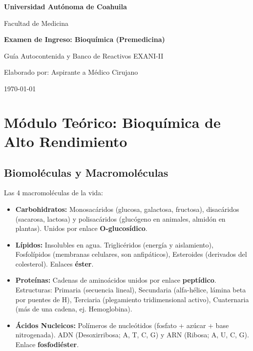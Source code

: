 \documentclass[spanish,letterpaper,oneside]{article}
\begin{document}
\begin{titlepage}
    \centering
    \vspace*{2cm}
    {\Huge \textbf{Universidad Autónoma de Coahuila} \par}
    \vspace{1cm}
    {\Large Facultad de Medicina \par}
    \vspace{2cm}
    {\LARGE \textbf{Examen de Ingreso: Bioquímica (Premedicina)} \par}
    \vspace{1cm}
    {\Large Guía Autocontenida y Banco de Reactivos EXANI-II \par}
    \vspace{3cm}
    {\large Elaborado por: Aspirante a Médico Cirujano \par}
    \vfill
    {\large \today \par}
\end{titlepage}

\tableofcontents
\newpage

\section{Módulo Teórico: Bioquímica de Alto Rendimiento}
\subsection{Biomoléculas y Macromoléculas}
Las 4 macromoléculas de la vida:
\begin{itemize}
    \item \textbf{Carbohidratos:} Monosacáridos (glucosa, galactosa, fructosa), disacáridos (sacarosa, lactosa) y polisacáridos (glucógeno en animales, almidón en plantas). Unidos por enlace \textbf{O-glucosídico}.
    \item \textbf{Lípidos:} Insolubles en agua. Triglicéridos (energía y aislamiento), Fosfolípidos (membranas celulares, son anfipáticos), Esteroides (derivados del colesterol). Enlaces \textbf{éster}.
    \item \textbf{Proteínas:} Cadenas de aminoácidos unidos por enlace \textbf{peptídico}. Estructuras: Primaria (secuencia lineal), Secundaria (alfa-hélice, lámina beta por puentes de H), Terciaria (plegamiento tridimensional activo), Cuaternaria (más de una cadena, ej. Hemoglobina).
    \item \textbf{Ácidos Nucleicos:} Polímeros de nucleótidos (fosfato + azúcar + base nitrogenada). ADN (Desoxirribosa; A, T, C, G) y ARN (Ribosa; A, U, C, G). Enlace \textbf{fosfodiéster}.
\end{itemize}
\end{document}
